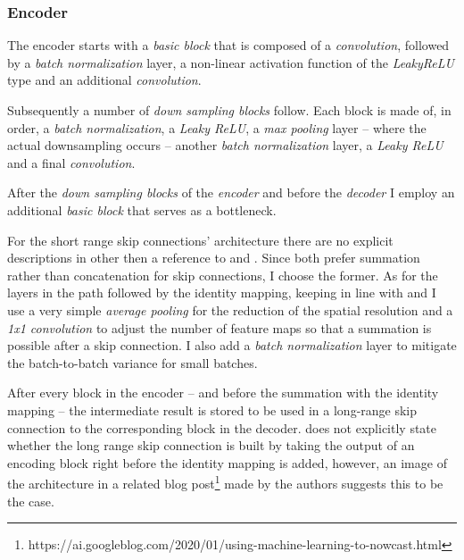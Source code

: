 \subsubsection{Encoder}
The encoder starts with a \textit{basic block} that is composed of a \textit{convolution}, followed by a \textit{batch normalization} layer, a non-linear activation function of the \textit{LeakyReLU} type and an additional \textit{convolution}. 

Subsequently a number of \textit{down sampling blocks} follow. Each block is made of, in order, a \textit{batch normalization}, a \textit{Leaky ReLU}, a \textit{max pooling} layer -- where the actual downsampling occurs -- another \textit{batch normalization} layer, a \textit{Leaky ReLU} and a final \textit{convolution}.

After the \textit{down sampling blocks} of the \textit{encoder} and before the \textit{decoder} I employ an additional \textit{basic block} that serves as a bottleneck.

For the short range skip connections' architecture there are no explicit descriptions in \citet{Agrawal2019MachineImages} other then a reference to \citet{Drozdzal2016TheSegmentation} and \citet{He2016DeepRecognition}. Since both prefer summation rather than concatenation for skip connections, I choose the former. As for the layers in the path followed by the identity mapping, keeping in line with \citet{He2016IdentityNetworks} and \citet{Drozdzal2016TheSegmentation} I use a very simple \textit{average pooling} for the reduction of the spatial resolution and a \textit{1x1 convolution} to adjust the number of feature maps so that a summation is possible after a skip connection. I also add a \textit{batch normalization} layer to mitigate the batch-to-batch variance for small batches.

After every block in the encoder -- and before the summation with the identity mapping -- the intermediate result is stored to be used in a long-range skip connection to the corresponding block in the decoder. \citet{Agrawal2019MachineImages} does not explicitly state whether the long range skip connection is built by taking the output of an encoding block right before the identity mapping is added, however, an image of the architecture in a related blog post\footnote{https://ai.googleblog.com/2020/01/using-machine-learning-to-nowcast.html} made by the authors suggests this to be the case. 

